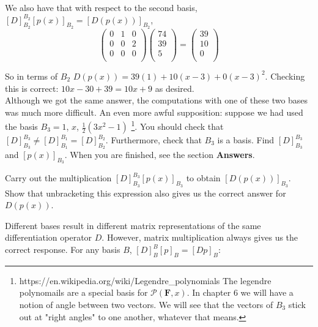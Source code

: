 \documentclass{article}
\theoremstyle{problemstyle}
\begin{document}
We also have that with respect to the second basis, $[D]_{B_2}^{B_2}[p(x)]_{B_2} = [D(p(x))]_{B_2}$,  $$
\begin{pmatrix} 0 & 1& 0  \\
 0 & 0& 2   \\
  0 & 0& 0   \\
\end{pmatrix}\begin{pmatrix} 74  \\
 39   \\
  5   \\
\end{pmatrix} = \begin{pmatrix} 39  \\
 10   \\
  0   \\
\end{pmatrix}$$

So in terms of $B_2$ $D(p(x)) = 39(1) + 10(x-3) + 0(x-3)^2$. Checking this is correct: $10x - 30 + 39 = 10x + 9$ as desired.\\

Although we got the same answer, the computations with one of these two bases was much more difficult. An even more awful supposition: suppose we had used the basis $B_3 = 1$, $x$, $\frac{1}{2}(3x^2-1)$ 
\footnote{https://en.wikipedia.org/wiki/Legendre\_polynomials The legendre polynomails are a special basis for $\mathcal{P}(\textbf{F},x)$. In chapter $6$ we will have a notion of angle between two vectors. We will see that the vectors of $B_3$ stick out at "right angles" to one another, whatever that means.}. You should check that 
$[D]^{B_3}_{B_3} \neq [D]^{B_1}_{B_1} = [D]^{B_2}_{B_2}$. Furthermore, check that $B_3$ is a basis. Find $[D]^{B_3}_{B_3}$ and $[p(x)]_{B_3}$. When you are finished, see the section \textbf{Answers}. 

Carry out the multiplication $[D]_{B_3}^{B_3}[p(x)]_{B_3}$ to obtain  $[D(p(x))]_{B_3}$. Show that unbracketing this expression also gives us the correct answer for $D(p(x))$. 

Different bases result in different matrix representations of the same differentiation operator $D$. However, matrix multiplication always gives us the correct response. For any basis $B$, $[D]_{B}^{B}[p]_{B}=[Dp]_{B}$: 

\begin{center}
\end{center}
\end{document}
